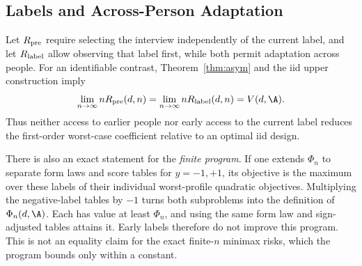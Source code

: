 \subsection{Labels and Across-Person Adaptation}
Let $R_{\rm pre}$ require selecting the interview independently of the current label, and let $R_{\rm label}$ allow observing that label first, while both permit adaptation across people. For an identifiable contrast, Theorem~\ref{thm:asym} and the iid upper construction imply
\[
 \lim_{n\to\infty}nR_{\rm pre}(d,n)
 =\lim_{n\to\infty}nR_{\rm label}(d,n)=V(d,\A).
\]
Thus neither access to earlier people nor early access to the current label reduces the first-order worst-case coefficient relative to an optimal iid design.

There is also an exact statement for the \emph{finite program}. If one extends $\Phi_n$ to separate form laws and score tables for $y=-1,+1$, its objective is the maximum over these labels of their individual worst-profile quadratic objectives. Multiplying the negative-label tables by $-1$ turns both subproblems into the definition of $\Phi_n(d,\A)$. Each has value at least $\Phi_n$, and using the same form law and sign-adjusted tables attains it. Early labels therefore do not improve this program. This is not an equality claim for the exact finite-$n$ minimax risks, which the program bounds only within a constant.



